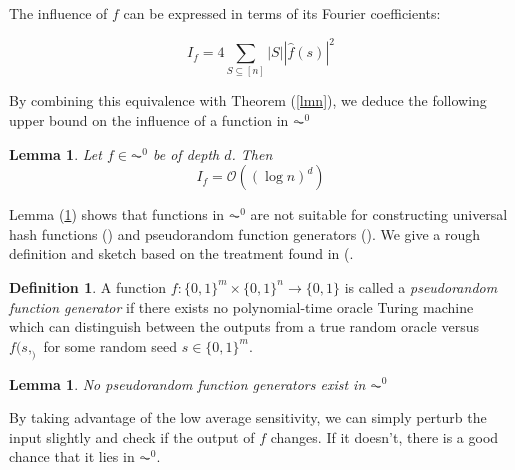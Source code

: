\documentclass{amsart}
\newtheorem{lemma}[theorem]{Lemma}
\theoremstyle{definition}
\newtheorem{definition}[theorem]{Definition}
\theoremstyle{remark}
\numberwithin{equation}{section}
\theoremstyle{remark}
\begin{document}
\noindent The influence of $f$ can be expressed in terms of its Fourier coefficients:

\begin{equation}
  I_f = 4\sum_{S \subseteq [n]} |S||\hat{f}(s)|^2
\end{equation}

\noindent By combining this equivalence with Theorem (\ref{lmn}), we deduce the following upper bound on the influence of a function in $\AC^0$

\begin{lemma} \label{influence}
  Let $f \in \AC^0$ be of depth $d$. Then
  \begin{equation}
    I_f = \mathcal{O}((\log n)^d)
  \end{equation}
\end{lemma}

\noindent Lemma (\ref{influence}) shows that functions in $\AC^0$  are not suitable for constructing universal hash functions (\cite{mansour}) and pseudorandom function generators (\cite{lmn}). We give a rough definition and sketch based on the treatment found in (\cite{lmn}.

\begin{definition}
  A function $f:\{0,1\}^m \times \{0,1\}^n \rightarrow \{0,1\}$ is called a \emph{pseudorandom function generator} if there exists no polynomial-time oracle Turing machine which can distinguish between the outputs from a true random oracle versus $f(s,_)$ for some random seed $s \in \{0,1\}^m$.
\end{definition}

\begin{lemma}
  No pseudorandom function generators exist in $\AC^0$
\end{lemma}
\noindent By taking advantage of the low average sensitivity, we can simply perturb the input slightly and check if the output of $f$ changes. If it doesn't, there is a good chance that
it lies in $\AC^0$.
\end{document}
